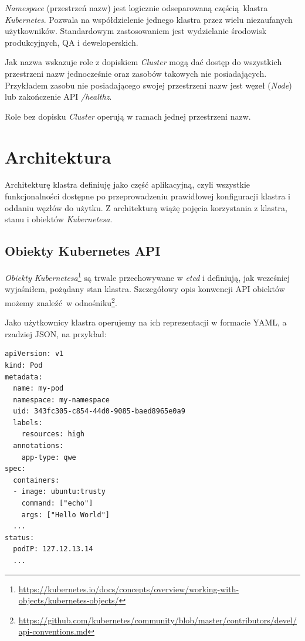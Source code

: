 \documentclass[a4paper,12pt,twoside,openany]{report}
\DeclareRobustCommand{\href}[2]{#2\footnote{\url{#1}}}
\begin{document}
\emph{Namespace} (przestrzeń nazw) jest logicznie odseparowaną
częścią~klastra \emph{Kubernetes}. Pozwala na współdzielenie jednego
klastra przez wielu niezaufanych użytkowników. Standardowym
zastosowaniem jest wydzielanie środowisk produkcyjnych, QA i
deweloperskich.

Jak nazwa wskazuje role z dopiskiem \emph{Cluster} mogą dać dostęp do
wszystkich przestrzeni nazw jednocześnie oraz zasobów takowych nie
posiadających. Przykładem zasobu nie posiadającego swojej przestrzeni
nazw jest węzeł (\emph{Node}) lub zakończenie API \emph{/healthz}.

Role bez dopisku \emph{Cluster} operują w ramach jednej przestrzeni
nazw.

\hypertarget{architektura}{%
\section{Architektura}\label{architektura}}

Architekturę klastra definiuję jako część aplikacyjną, czyli wszystkie
funkcjonalności dostępne po przeprowadzeniu prawidłowej konfiguracji
klastra i oddaniu węzłów do użytku. Z architekturą wiążę pojęcia
korzystania z klastra, stanu i obiektów \emph{Kubernetesa}.

\hypertarget{obiekty-kubernetes-api}{%
\subsection{Obiekty Kubernetes API}\label{obiekty-kubernetes-api}}

\href{https://kubernetes.io/docs/concepts/overview/working-with-objects/kubernetes-objects/}{\emph{Obiekty
Kubernetesa}} są trwale przechowywane w \emph{etcd} i definiują, jak
wcześniej wyjaśniłem, pożądany stan klastra. Szczegółowy opis konwencji
API obiektów możemy znaleźć~w
\href{https://github.com/kubernetes/community/blob/master/contributors/devel/api-conventions.md}{odnośniku}.

Jako użytkownicy klastra operujemy na ich reprezentacji w formacie YAML,
a rzadziej JSON, na przykład:

\begin{lstlisting}
apiVersion: v1
kind: Pod
metadata:
  name: my-pod 
  namespace: my-namespace
  uid: 343fc305-c854-44d0-9085-baed8965e0a9
  labels:
    resources: high
  annotations:
    app-type: qwe
spec:
  containers:
  - image: ubuntu:trusty
    command: ["echo"]
    args: ["Hello World"]
  ...
status:
  podIP: 127.12.13.14
  ...
\end{lstlisting}
\end{document}
